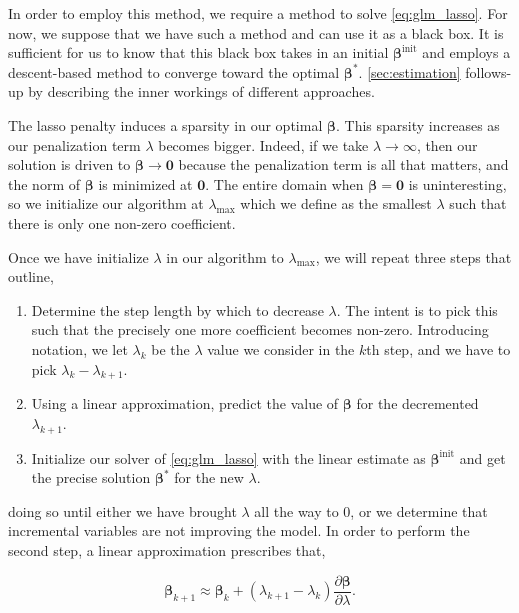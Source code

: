 \documentclass[letterpaper, 12pt]{article}
\newcommand{\bbeta}{\bm \beta}
\begin{document}
In order to employ this method, we require a method to solve
\eqref{eq:glm_lasso}. For now, we suppose that we have such a method and can use
it as a black box. It is sufficient for us to know that this black box takes in
an initial $\bbeta^\text{init}$ and employs a descent-based method to converge
toward the optimal $\bbeta^*$. \cref{sec:estimation} follows-up by describing
the inner workings of different approaches.

The lasso penalty induces a sparsity in our optimal $\bbeta$. This sparsity
increases as our penalization term $\lambda$ becomes bigger. Indeed, if we take
$\lambda \to \infty$, then our solution is driven to $\bbeta \to \bm{0}$ because
the penalization term is all that matters, and the norm of $\bbeta$ is minimized
at $\bm{0}$. The entire domain when $\bbeta = \bm{0}$ is uninteresting, so we
initialize our algorithm at $\lambda_\text{max}$ which we define as the smallest
$\lambda$ such that there is only one non-zero coefficient.

Once we have initialize $\lambda$ in our algorithm to $\lambda_\text{max}$, we
will repeat three steps that \cite{park2007l1} outline,

\begin{enumerate}

\item Determine the step length by which to decrease $\lambda$. The intent is to
pick this such that the precisely one more coefficient becomes non-zero.
Introducing notation, we let $\lambda_k$ be the $\lambda$ value we consider in
the $k$th step, and we have to pick $\lambda_k - \lambda_{k+1}$.

\item Using a linear approximation, predict the value of $\bbeta$ for the
decremented $\lambda_{k+1}$.

\item Initialize our solver of \eqref{eq:glm_lasso} with the linear estimate as
$\bbeta^\text{init}$ and get the precise solution $\bbeta^*$ for the new
$\lambda$.

\end{enumerate}

doing so until either we have brought $\lambda$ all the way to 0, or we
determine that incremental variables are not improving the model. In order to
perform the second step, a linear approximation prescribes that,

\[ \bbeta_{k+1} \approx \bbeta_k + (\lambda_{k+1} - \lambda_k) \frac{\partial
\bbeta}{\partial \lambda}.\]
\end{document}
